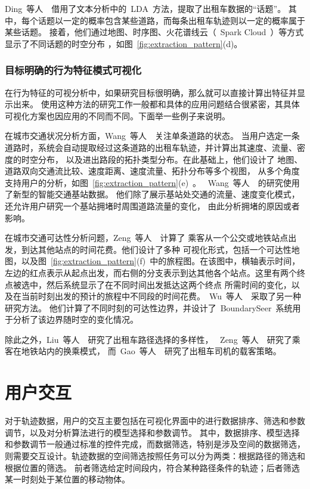 \documentclass[12pt,twocolumn]{article}
\begin{document}
Ding~等人~\citep{ChuSZWYZ2014}~借用了文本分析中的~LDA~方法，提取了出租车数据的“话题”。
其中，每个话题以一定的概率包含某些道路，而每条出租车轨迹则以一定的概率属于某些话题。
接着，他们通过地图、时序图、火花谱线云（~Spark Cloud~）等方式显示了不同话题的时空分布
，如图~\ref{fig:extraction_pattern}(d)。

\subsubsection{目标明确的行为特征模式可视化}

在行为特征的可视分析中，如果研究目标很明确，那么就可以直接计算出特征并显示出来。
使用这种方法的研究工作一般都和具体的应用问题结合很紧密，其具体可视化方案也因应用的不同而不同。下面举一些例子来说明。

在城市交通状况分析方面，Wang~等人~\citep{WangCWZHG2014}~关注单条道路的状态。
当用户选定一条道路时，系统会自动提取经过这条道路的出租车轨迹，并计算出其速度、流量、密度的时空分布，
以及进出路段的拓扑类型分布。在此基础上，他们设计了
地图、道路双向交通流比较、速度距离、速度流量、拓扑分布等多个视图，
从多个角度支持用户的分析，如图~\ref{fig:extraction_pattern}(e)~。
~Wang~等人~\citep{WangYLYQY2014}~的研究使用了新型的智能交通基站数据。
他们除了展示基站处交通的流量、速度变化模式，还允许用户研究一个基站拥堵时周围道路流量的变化，
由此分析拥堵的原因或者影响。

在城市交通可达性分析问题，Zeng~等人~\citep{ZengFAEQ2014}~计算了
乘客从一个公交或地铁站点出发，到达其他站点的时间花费。他们设计了多种
可视化形式，包括一个可达性地图，以及图~\ref{fig:extraction_pattern}(f)~中的旅程图。在该图中，横轴表示时间，
左边的红点表示从起点出发，而右侧的分支表示到达其他各个站点。这里有两个终点被选中，然后系统显示了在不同时间出发抵达这两个终点
所需时间的变化，以及在当前时刻出发的预计的旅程中不同段的时间花费。~Wu~等人~\citep{WuZQCGN2014}~采取了另一种研究方法。
他们计算了不同时刻的可达性边界，并设计了~BoundarySeer~系统用于分析了该边界随时空的变化情况。

除此之外，Liu~等人~\citep{LiuGLLQN2011}~研究了出租车路径选择的多样性，
~Zeng~等人~\citep{ZengFAQ2013}~研究了乘客在地铁站内的换乘模式，
而~Gao~等人~\citep{GaoXLLLQ2012}~研究了出租车司机的载客策略。

\section{用户交互}
\label{section:interaction}

对于轨迹数据，用户的交互主要包括在可视化界面中的进行数据排序、筛选和参数调节，以及对分析算法进行的模型选择和参数调节。
其中，数据排序、模型选择和参数调节一般通过标准的控件完成，而数据筛选，特别是涉及空间的数据筛选，
则需要交互设计。轨迹数据的空间筛选按照任务可以分为两类：根据路径的筛选和根据位置的筛选。
前者筛选给定时间段内，符合某种路径条件的轨迹；后者筛选某一时刻处于某位置的移动物体。
\end{document}

